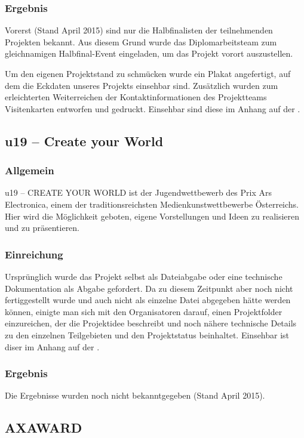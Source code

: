 \subsubsection{Ergebnis}
Vorerst (Stand April 2015) sind nur die Halbfinalisten der teilnehmenden Projekten bekannt.
Aus diesem Grund wurde das Diplomarbeitsteam
zum gleichnamigen Halbfinal-Event eingeladen, um das Projekt vorort auszustellen.

Um den eigenen Projektstand zu schmücken wurde ein Plakat angefertigt, auf dem die Eckdaten unseres
Projekts einsehbar sind.
Zusätzlich wurden zum erleichterten Weiterreichen der Kontaktinformationen des Projektteams Visitenkarten
entworfen und gedruckt. Einsehbar sind diese im Anhang auf der .

\subsection{u19 -- Create your World}
\subsubsection{Allgemein}
u19 – CREATE YOUR WORLD ist der Jugendwettbewerb des Prix Ars Electronica, einem der traditionsreichsten Medienkunstwettbewerbe Österreichs.
Hier wird die Möglichkeit geboten, eigene Vorstellungen und Ideen zu realisieren und zu präsentieren.

\subsubsection{Einreichung}
Ursprünglich wurde das Projekt selbst als Dateiabgabe oder eine technische Dokumentation als Abgabe gefordert. Da \sblit zu diesem Zeitpunkt
aber noch nicht fertiggestellt wurde und auch nicht als einzelne Datei abgegeben hätte werden können,
einigte man sich mit den Organisatoren darauf, einen Projektfolder einzureichen, der die Projektidee
beschreibt und noch nähere technische Details zu den einzelnen Teilgebieten und den Projektstatus beinhaltet. Einsehbar ist diser im Anhang auf der .


\subsubsection{Ergebnis}
Die Ergebnisse wurden noch nicht bekanntgegeben (Stand April 2015).

\subsection{AXAWARD}
